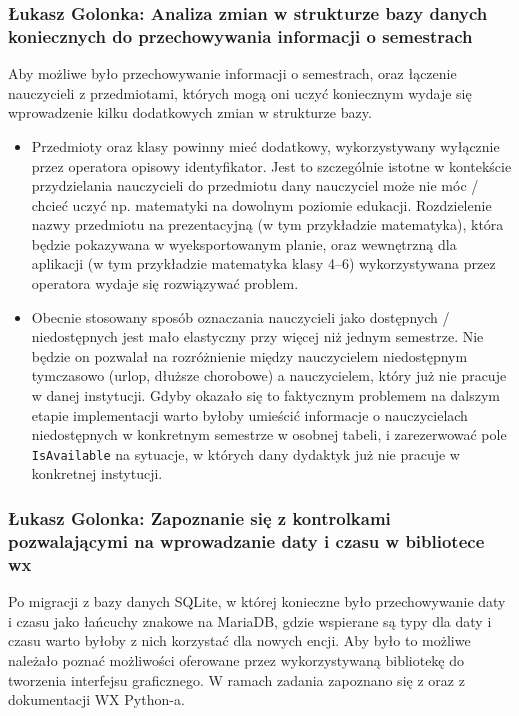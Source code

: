 \documentclass[12pt,a4paper,oneside]{article}
\theoremstyle{definition}
\numberwithin{equation}{section}
\begin{document}
\subsubsection{Łukasz Golonka: Analiza zmian w strukturze bazy danych koniecznych do przechowywania informacji o semestrach}
Aby możliwe było przechowywanie informacji o semestrach, oraz łączenie nauczycieli z przedmiotami, których mogą oni uczyć koniecznym wydaje się wprowadzenie kilku dodatkowych zmian w strukturze bazy.
\begin{itemize}
	\item Przedmioty oraz klasy powinny mieć dodatkowy, wykorzystywany wyłącznie przez operatora opisowy identyfikator.
	Jest to szczególnie istotne w kontekście przydzielania nauczycieli do przedmiotu dany nauczyciel może nie móc / chcieć uczyć np. matematyki na dowolnym poziomie edukacji.
	Rozdzielenie nazwy przedmiotu na prezentacyjną (w tym przykładzie matematyka), która będzie pokazywana w wyeksportowanym planie, oraz wewnętrzną dla aplikacji (w tym przykładzie matematyka klasy 4--6) wykorzystywana przez operatora wydaje się rozwiązywać problem.
	\item Obecnie stosowany sposób oznaczania nauczycieli jako dostępnych / niedostępnych jest mało elastyczny przy więcej niż jednym semestrze.
	Nie będzie on pozwalał na rozróżnienie między nauczycielem niedostępnym tymczasowo (urlop, dłuższe chorobowe) a nauczycielem, który już nie pracuje w danej instytucji.
	Gdyby okazało się to faktycznym problemem na dalszym etapie implementacji warto byłoby umieścić informacje o nauczycielach niedostępnych w konkretnym semestrze w osobnej tabeli, i zarezerwować pole \lstinline{IsAvailable} na sytuacje, w których dany dydaktyk już nie pracuje w konkretnej instytucji.
\end{itemize}

\subsubsection{Łukasz Golonka: Zapoznanie się z kontrolkami pozwalającymi na wprowadzanie daty i czasu w bibliotece wx}
Po migracji z bazy danych SQLite, w której konieczne było przechowywanie daty i czasu jako łańcuchy znakowe na MariaDB, gdzie wspierane są typy dla daty i czasu warto byłoby z nich korzystać dla nowych encji.
Aby było to możliwe należało poznać możliwości oferowane przez wykorzystywaną bibliotekę do tworzenia interfejsu graficznego. 
W ramach zadania zapoznano się z \cite{dt} oraz \cite{picker} z dokumentacji WX Python-a.
\end{document}
